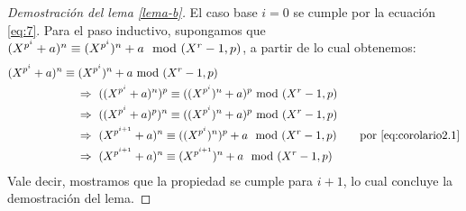	\begin{proof}[Demostración del lema \ref{lema-b}]
		El caso base $i = 0$ se cumple por la ecuación \eqref{eq:7}. Para el paso inductivo, supongamos que $(X^{p^i}+a)^n\equiv (X^{p^i})^n + a \mod (X^r-1,p)$, a partir de lo cual obtenemos: 
		\begin{align*}
			&(X^{p^i}+a)^n\equiv (X^{p^i})^n + a \!\!\mod (X^r-1,p)\\
			&\hspace{60pt}\Rightarrow \ ((X^{p^i}+a)^n)^p\equiv ((X^{p^i})^n + a)^p \!\!\mod (X^r-1,p)\\
			&\hspace{60pt}\Rightarrow \ ((X^{p^i}+a)^p)^n\equiv ((X^{p^i})^n + a)^p \!\!\mod (X^r-1,p)\\
			&\hspace{60pt}\Rightarrow \ (X^{p^{i+1}}+a)^n\equiv ((X^{p^i})^n)^p + a \mod (X^r-1,p) \quad\quad \text{por }\eqref{eq:corolario2.1}\\
			&\hspace{60pt}\Rightarrow \ (X^{p^{i+1}}+a)^n\equiv (X^{p^{i+1}})^n + a \mod (X^r-1,p)
		\end{align*}
		Vale decir, mostramos que la propiedad se cumple para $i+1$, lo cual concluye la demostración del lema. 
	\end{proof}

        
